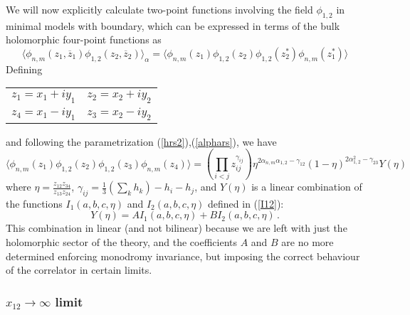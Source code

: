 \documentclass[a4paper,12pt]{report}
\begin{document}
We will now explicitly calculate two-point functions involving the field $\phi_{1,2}$ in minimal models with
boundary, which can be expressed in terms of the bulk holomorphic four-point functions as
\begin{equation}
\langle \phi _{n,m}\left(z_{1},\overline{z}_{1} \right)\phi _{1,2}\left(z_{2},\overline{z}_{2} \right)\rangle
_{\alpha}= \langle \phi _{n,m}\left(z_{1} \right)\phi _{1,2}\left(z_{2} \right)\phi _{1,2}\left(z^{*}_{2}
\right)\phi _{n,m}\left(z^{*}_{1} \right)\rangle
\end{equation}
Defining
\begin{center}
\begin{tabular}{c|c}
$z_{1}=x_{1}+iy_{1}$ & $z_{2}=x_{2}+iy_{2}$ \\
$z_{4}=x_{1}-iy_{1}$ & $z_{3}=x_{2}-iy_{2}$ \\
\end{tabular}
\end{center}
and following the parametrization (\ref{hrs2}),(\ref{alphars}), we have
\begin{equation}\label{explcalc}
\langle \phi _{n,m}\left(z_{1} \right)\phi _{1,2}\left(z_{2} \right)\phi _{1,2}\left(z_{3} \right)\phi
_{n,m}\left(z_{4} \right)\rangle=\left(\prod_{i<j}z_{ij}^{\gamma _{ij}} \right)\eta^{2\alpha
_{n,m}\alpha_{1,2}-\gamma _{12}} \left(1-\eta  \right)^{2\alpha _{1,2}^{2}-\gamma _{23}} Y\left(\eta  \right)
\end{equation}
where $\eta =\frac{z_{12}z_{34}}{z_{13}z_{24}}$, $\gamma _{ij}=\frac{1}{3}\left(\sum _{k}h_{k}
\right)-h_{i}-h_{j}$, and $Y\left(\eta  \right)$ is a linear combination of the functions $I_{1}\left(a,b,c,\eta
\right)$ and $I_{2}\left(a,b,c,\eta  \right)$ defined in (\ref{I12}):
\begin{equation}
Y\left(\eta  \right)=A I_{1}\left(a,b,c,\eta  \right)+B I_{2}\left(a,b,c,\eta  \right) \,.
\end{equation}
This combination in linear (and not bilinear) because we are left with just the holomorphic sector of the theory,
and the coefficients $A$ and $B$ are no more determined enforcing monodromy invariance, but imposing the correct
behaviour of the correlator in certain limits.

\subsubsection{$x_{12}\rightarrow \infty$ limit}

\vspace{2cm}
\end{document}
